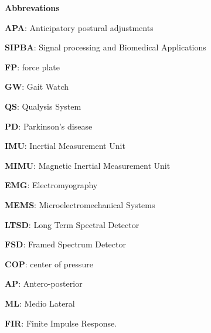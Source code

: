 
\begin{titlepage}
\label{ch:abbrevations}
{ \huge \bfseries Abbrevations \\[0.4cm] }

\textbf{APA}: Anticipatory postural adjustments

\textbf{SIPBA}: Signal processing and Biomedical Applications

\textbf{FP}: force plate

\textbf{GW}: Gait Watch

\textbf{QS}: Qualysis System

\textbf{PD}: Parkinson’s disease

\textbf{IMU}: Inertial Measurement Unit

\textbf{MIMU}: Magnetic Inertial Measurement Unit

\textbf{EMG}: Electromyography

\textbf{MEMS}: Microelectromechanical Systems

\textbf{LTSD}: Long Term Spectral Detector

\textbf{FSD}: Framed Spectrum Detector

\textbf{COP}: center of pressure

\textbf{AP}: Antero-posterior

\textbf{ML}: Medio Lateral

\textbf{FIR}: Finite Impulse Response.


\end{titlepage} 